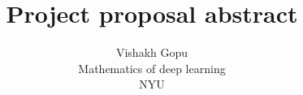 \documentclass[12pt]{article}
\title{%
\textbf{Project proposal abstract}
}
\author{
Vishakh Gopu \\
Mathematics of deep learning\\
NYU 
}
\begin{document}
\maketitle
\bigskip

\clearpage
\glsresetall{}



\clearpage




\clearpage
\appendix

%
\end{document}
